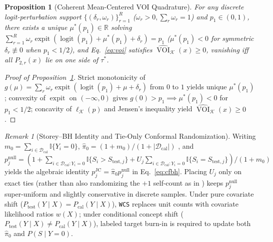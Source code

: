 \documentclass[11pt]{article}
\newtheorem{proposition}{Proposition}
\theoremstyle{remark}
\newtheorem{remark}{Remark}
\begin{document}
\begin{proposition}[Coherent Mean-Centered VOI Quadrature]
\label{prop:coherent_voi}
For any discrete logit-perturbation support $\{(\delta_r, \omega_r)\}_{r=1}^R$ ($\omega_r > 0, \sum_r \omega_r = 1$) and $p_1 \in (0, 1)$, there exists a unique $\mu^*(p_1) \in \mathbb{R}$ solving $\sum_{r=1}^R \omega_r \operatorname{expit}(\operatorname{logit}(p_1) + \mu^*(p_1) + \delta_r) = p_1$ ($\mu^*(p_1) < 0$ for symmetric $\delta_r \not\equiv 0$ when $p_1 < 1/2$), and Eq.~\eqref{eq:voi} satisfies $\widehat{\operatorname{VOI}}_{\mathcal{K}}(x) \ge 0$, vanishing iff all $P_{2,r}(x)$ lie on one side of $\tau^*$.
\end{proposition}

\begin{proof}[Proof of Proposition~\ref{prop:coherent_voi}]
Strict monotonicity of $g(\mu) = \sum_r \omega_r \operatorname{expit}(\operatorname{logit}(p_1) + \mu + \delta_r)$ from $0$ to $1$ yields unique $\mu^*(p_1)$; convexity of $\operatorname{expit}$ on $(-\infty, 0)$ gives $g(0) > p_1 \implies \mu^*(p_1) < 0$ for $p_1 < 1/2$; concavity of $\ell_{\mathcal{K}}(p)$ and Jensen's inequality yield $\widehat{\operatorname{VOI}}_{\mathcal{K}}(x) \ge 0$.
\end{proof}

\begin{remark}[Storey--BH Identity and Tie-Only Conformal Randomization]
\label{rem:cfbh_storey}
Writing $m_0 = \sum_{i \in \mathcal{D}_{\text{cal}}} \mathbb{I}\{Y_i = 0\}$, $\hat{\pi}_0 = (1 + m_0)/(1 + |\mathcal{D}_{\text{cal}}|)$ \citep{storey2004strong}, and $p_j^{\text{null}} = (1 + \sum_{i \in \mathcal{D}_{\text{cal}}: Y_i=0}\mathbb{I}\{S_i > S_{\text{test},j}\} + U_j \sum_{i \in \mathcal{D}_{\text{cal}}: Y_i=0}\mathbb{I}\{S_i = S_{\text{test},j}\}) / (1 + m_0)$ yields the algebraic identity $p_j^{\text{JC}} = \hat{\pi}_0 p_j^{\text{null}}$ in Eq.~\eqref{eq:cfbh}. Placing $U_j$ only on exact ties (rather than also randomizing the $+1$ self-count as in \citealp{jin2023selection}) keeps $p_j^{\text{null}}$ super-uniform and slightly conservative in discrete samples. Under pure covariate shift ($P_{\text{test}}(Y\mid X) = P_{\text{cal}}(Y\mid X)$), \citet{jin2025wcs} \texttt{WCS} replaces unit counts with covariate likelihood ratios $w(X)$; under conditional concept shift ($P_{\text{test}}(Y\mid X) \ne P_{\text{cal}}(Y\mid X)$), labeled target burn-in is required to update both $\hat{\pi}_0$ and $P(S \mid Y=0)$.
\end{remark}
\end{document}
